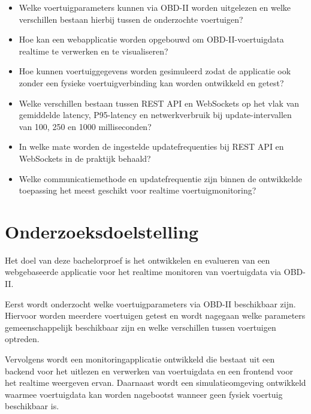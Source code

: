 \begin{itemize}

    \item Welke voertuigparameters kunnen via OBD-II worden uitgelezen en welke
    verschillen bestaan hierbij tussen de onderzochte voertuigen?

    \item Hoe kan een webapplicatie worden opgebouwd om OBD-II-voertuigdata
    realtime te verwerken en te visualiseren?

    \item Hoe kunnen voertuiggegevens worden gesimuleerd zodat de applicatie ook
    zonder een fysieke voertuigverbinding kan worden ontwikkeld en getest?

    \item Welke verschillen bestaan tussen REST API en WebSockets op het vlak
    van gemiddelde latency, P95-latency en netwerkverbruik bij
    update-intervallen van 100, 250 en 1000 milliseconden?

    \item In welke mate worden de ingestelde updatefrequenties bij REST API en
    WebSockets in de praktijk behaald?

    \item Welke communicatiemethode en updatefrequentie zijn binnen de
    ontwikkelde toepassing het meest geschikt voor realtime
    voertuigmonitoring?

\end{itemize}


\section{Onderzoeksdoelstelling}

Het doel van deze bachelorproef is het ontwikkelen en evalueren van een
webgebaseerde applicatie voor het realtime monitoren van voertuigdata via
OBD-II.

Eerst wordt onderzocht welke voertuigparameters via OBD-II beschikbaar zijn.
Hiervoor worden meerdere voertuigen getest en wordt nagegaan welke parameters
gemeenschappelijk beschikbaar zijn en welke verschillen tussen voertuigen
optreden.

Vervolgens wordt een monitoringapplicatie ontwikkeld die bestaat uit een
backend voor het uitlezen en verwerken van voertuigdata en een frontend voor
het realtime weergeven ervan. Daarnaast wordt een simulatieomgeving ontwikkeld
waarmee voertuigdata kan worden nagebootst wanneer geen fysiek voertuig
beschikbaar is.

